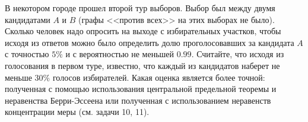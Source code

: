 \begin{problem}
В некотором городе прошел второй тур выборов. Выбор был между двумя кандидатами $A$ и $B$ (графы <<против всех>> на этих выборах не было). 
Сколько человек надо опросить на выходе с избирательных участков, чтобы исходя из ответов можно было определить долю проголосовавших 
за кандидата $A$ с точностью $5\%$ и с вероятностью не меньшей $0.99$. Считайте, что исходя из голосования в первом туре, известно, 
что каждый из кандидатов наберет не меньше $30\%$ голосов избирателей. Какая оценка является более точной: полученная с помощью использования центральной предельной теоремы и неравенства Берри-Эссеена или полученная с использованием неравенств концентрации меры (см. задачи 10, 11).
\end{problem}

\begin{remark}
\begin{comment}
Обозначим долю проголосовавших за кандидата $A$ через $p$. По условию задачи $p\in[0.3, 0.7]$. 
Результат опроса одного человека является с.в. $X\in \text{Be}(p)$, где 
$$
X={\mathcal I}(\text{<<опрошенный проголосовал за кандидата $A$>>}). 
$$
Пусть опрошено $n$ человек, $S_n=X_1+\ldots +X_n$, $X_k\in  \text{Be}(p)$. В задаче требуется найти $n$, при котором 
эмпирическая доля $\frac{S_n}{n}$ проголосовавших за кандидата $A$ оценивает $p$ с точностью $\alpha=0.05$ с вероятностью 
$\gamma=0.99$: 
$$
{\mathbb P}\Bigl(\frac{S_n}{n}\in[p-\alpha,p+\alpha] \Bigr)\geqslant\gamma . 
$$
Имеем 
$$
{\mathbb P}\Bigl(\frac{S_n}{n}\in[p-\alpha,p+\alpha] \Bigr)=
{\mathbb P}\Bigl(\Bigl|\frac{S_n-np}{n}\Bigr|\leqslant \alpha\Bigr)=
$$
$$
={\mathbb P}\Bigl(\Bigl|\frac{S_n-np}{\sqrt{n\cdot p(1-p)}}\Bigr|\leqslant \frac{\sqrt{n}\alpha}{\sqrt{p(1-p)}}\Bigr)=
{\mathbb P}\Bigl(\Bigl|\frac{S_n-{\mathbb E}S_n}{\sqrt{ Var S_n}}\Bigr|\leqslant \frac{\sqrt{n}\alpha}{\sqrt{p(1-p)}} \Bigr) . 
$$
Согласно ц.п.т. при больших $n$ можно считать $\frac{S_n-{\mathbb E}S_n}{\sqrt{Var S_n}}\in N(0,1)$, поэтому 
$$
{\mathbb P}\Bigl(\Bigl|\frac{S_n-{\mathbb E}S_n}{\sqrt{Var S_n}}\Bigr|\leqslant \frac{\sqrt{n}\alpha}{\sqrt{p(1-p)}} \Bigr)
\approx \Phi\Bigl(\frac{\sqrt{n}\alpha}{\sqrt{p(1-p)}}\Bigr)-\Phi\Bigl(-\frac{\sqrt{n}\alpha}{\sqrt{p(1-p)}}\Bigr)=
2\Phi\Bigl(\frac{\sqrt{n}\alpha}{\sqrt{p(1-p)}}\Bigr)-1 . 
$$
Чтобы условие $2\Phi\Bigl(\frac{\sqrt{n}\alpha}{\sqrt{p(1-p)}}\Bigr)-1\geqslant \gamma$ выполнялось при всех $p\in[0.3, 0.7]$, 
достаточно чтобы оно выполнялось при наименьшем возможном $\frac{\sqrt{n}\alpha}{\sqrt{p(1-p)}}$. Это достигается 
при ${\bar p}=0.5$. Имеем 

\end{comment}
\end{remark}
